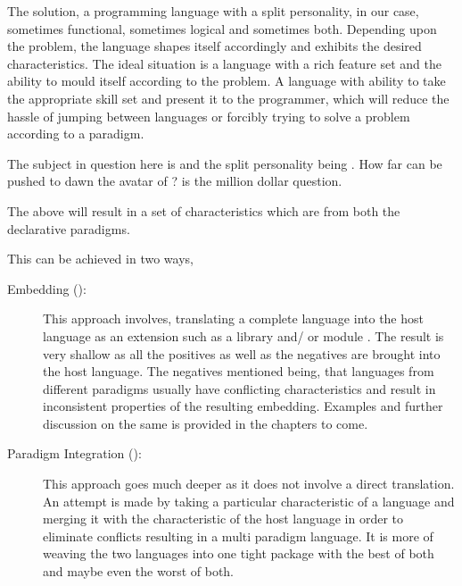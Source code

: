 \documentclass[thesis-solanki.tex]{subfiles}
\begin{document}
\par The solution, a programming language with a split personality, in our case, sometimes functional, sometimes logical and sometimes both. 
Depending upon the problem, the language shapes itself accordingly and exhibits the desired characteristics. The ideal situation is a language with a rich 
feature set and the ability to mould itself according to the problem. A language with ability to take the appropriate skill set and present it to the 
programmer, which will reduce the hassle of jumping between languages or forcibly trying to solve a problem according to a paradigm.  

\par The subject in question here is  and the split personality being . How far can  be pushed to 
dawn the avatar of  ? is the million dollar question. 

The above will result in a set of characteristics which are from both the declarative paradigms. 
   
This can be achieved in two ways,
\begin{description}
\item [Embedding ():]

\par This approach involves, translating a complete language into the host language as an extension such as a library and/ or module . The result is very 
shallow as all the positives as well as the negatives are brought into the host language. The negatives mentioned being, that languages from different 
paradigms usually have conflicting characteristics and result in inconsistent properties of the resulting embedding. Examples and further discussion on 
the same is provided in the chapters to come.  

\item [Paradigm Integration ():]

\par This approach goes much deeper as it does not involve a direct translation. An attempt is made by taking a particular characteristic of a language 
and merging it with the characteristic of the host language in order to eliminate conflicts resulting in a multi paradigm language. It is more of weaving 
the two languages into one tight package with the best of both and maybe even the worst of both.       
\end{description}
\end{document}
